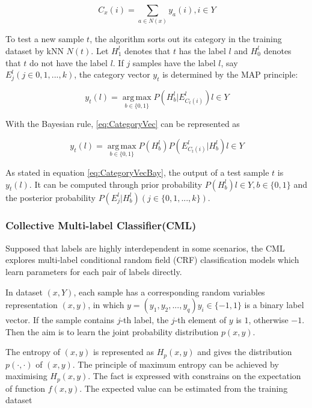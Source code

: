 \begin{equation}\label{eq:KNNCounting}
C_{x}(i) = \sum_{a \in N(x)} y_{a}(i), i \in Y
\end{equation}

To test a new sample $t$, the algorithm sorts out its category in the training dataset by kNN $N(t)$. Let $H_{1}^l$ denotes that $t$ has the label $l$ and $H_{0}^l$ denotes that $t$ do not have the label $l$. If $j$ samples have the label $l$, say $E_{j}^l (j \in {0,1,...,k})$, the category vector $y_{t}$ is determined by the MAP principle:

\begin{equation}\label{eq:CategoryVec}
y_{t}(l) = \operatorname*{arg\,max}_{b \in \{0,1\}} P(H_{b}^l|E_{C_{t}(i) }^l) l \in Y
\end{equation}

With the Bayesian rule, \ref{eq:CategoryVec} can be represented as

\begin{equation}\label{eq:CategoryVecBay}
y_{t}(l) = \operatorname*{arg\,max}_{b \in \{0,1\}} P(H_{b}^l)P(E_{C_{t}(i) }^l|H_{b}^l) l \in Y
\end{equation}

As stated in equation \ref{eq:CategoryVecBay}, the output of a test sample $t$ is $y_{t}(l)$. It can be computed through prior probability $P(H_{b}^l) l \in Y, b \in \{0,1\}$ and the posterior probability $P(E_{j}^l|H_{b}^l) (j \in \{0,1,...,k\})$.

\subsubsection{Collective Multi-label Classifier(CML)}

Supposed that labels are highly interdependent in some scenarios, the CML explores multi-label conditional random field (CRF) classification models which learn  parameters for each pair of labels directly\citep{ghamrawi2005collective}.

In dataset $(x,Y)$, each sample has a corresponding random variables representation $(x,y)$, in which $y = (y_{1},y_{2},...,y_{q})  y_{i} \in \{-1,1\}$ is a binary label vector. If the sample contains $j$-th label, the $j$-th element of $y$ is $1$, otherwise $-1$. Then the aim is to learn the joint probability distribution $p(x,y)$.

The entropy of $(x,y)$ is represented as $H_{p}(x,y)$ and gives the distribution $p(\cdot,\cdot)$ of $(x,y)$. The principle of maximum entropy can be achieved by maximising $H_{p}(x,y)$. The fact is expressed with constrains on the expectation of function $f(x,y)$. The expected value can be estimated from the training dataset

